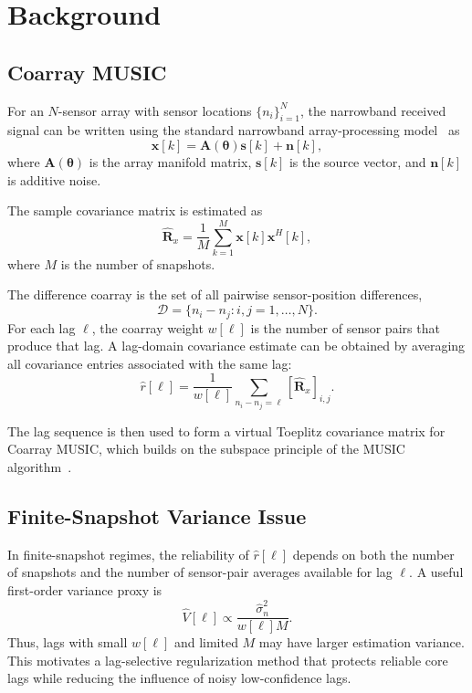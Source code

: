 \documentclass[conference]{IEEEtran}
\begin{document}
\section{Background}

\subsection{Coarray MUSIC}

For an $N$-sensor array with sensor locations $\{n_i\}_{i=1}^{N}$, the narrowband received signal can be written using the standard narrowband array-processing model~\cite{vantrees2002optimum} as
\begin{equation}
    \mathbf{x}[k] = \mathbf{A}(\boldsymbol{\theta})\mathbf{s}[k] + \mathbf{n}[k],
\end{equation}
where $\mathbf{A}(\boldsymbol{\theta})$ is the array manifold matrix, $\mathbf{s}[k]$ is the source vector, and $\mathbf{n}[k]$ is additive noise.

The sample covariance matrix is estimated as
\begin{equation}
    \hat{\mathbf{R}}_x =
    \frac{1}{M}
    \sum_{k=1}^{M}
    \mathbf{x}[k]\mathbf{x}^{H}[k],
\end{equation}
where $M$ is the number of snapshots.

The difference coarray is the set of all pairwise sensor-position differences,
\begin{equation}
    \mathcal{D} = \{n_i - n_j: i,j = 1,\ldots,N\}.
\end{equation}
For each lag $\ell$, the coarray weight $w[\ell]$ is the number of sensor pairs that produce that lag. A lag-domain covariance estimate can be obtained by averaging all covariance entries associated with the same lag:
\begin{equation}
    \hat{r}[\ell] =
    \frac{1}{w[\ell]}
    \sum_{n_i-n_j=\ell}
    [\hat{\mathbf{R}}_x]_{i,j}.
\end{equation}

The lag sequence is then used to form a virtual Toeplitz covariance matrix for Coarray MUSIC, which builds on the subspace principle of the MUSIC algorithm~\cite{schmidt1986music}.

\subsection{Finite-Snapshot Variance Issue}

In finite-snapshot regimes, the reliability of $\hat{r}[\ell]$ depends on both the number of snapshots and the number of sensor-pair averages available for lag $\ell$. A useful first-order variance proxy is
\begin{equation}
    \widehat{V}[\ell] \propto \frac{\hat{\sigma}_n^2}{w[\ell]M}.
\end{equation}
Thus, lags with small $w[\ell]$ and limited $M$ may have larger estimation variance. This motivates a lag-selective regularization method that protects reliable core lags while reducing the influence of noisy low-confidence lags.
\end{document}
